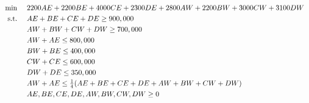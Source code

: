 \documentclass[12pt]{article}
\begin{document}
\begin{equation}
\label{eq:new_england_power_opt}
\begin{array}{rl}
\min~ & 2200AE + 2200BE + 4000CE + 2300DE + 2800AW + 2200BW + 3000CW + 3100DW \vspace{3pt}\\
\textup{s.t.}~ & AE + BE + CE + DE \geq 900,000 \vspace{3pt}\\
& AW + BW + CW + DW \geq 700,000 \vspace{3pt}\\
& AW + AE \leq 800,000 \vspace{3pt}\\
& BW + BE \leq 400,000 \vspace{3pt}\\
& CW + CE \leq 600,000 \vspace{3pt}\\
& DW + DE \leq 350,000 \vspace{3pt}\\
& AW + AE \leq \frac{1}{4}(AE + BE + CE + DE + AW + BW + CW + DW) \vspace{3pt}\\
& AE, BE, CE, DE, AW, BW, CW, DW \geq 0 \\
\end{array}
\end{equation}
\end{document}
